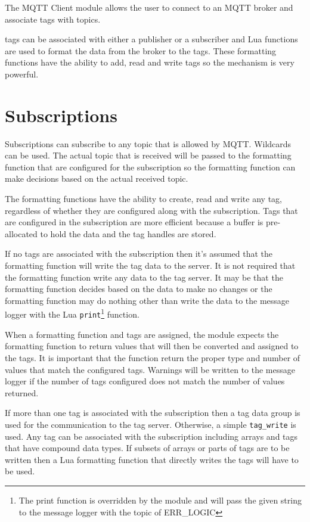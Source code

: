 The MQTT Client module allows the user to connect to an MQTT broker and associate tags with topics.

\opendax tags can be associated with either a publisher or a subscriber and Lua functions are used to format the data from the broker to the \opendax tags.  These formatting functions have the ability to add, read and write tags so the mechanism is very powerful.

\section{Subscriptions}

Subscriptions can subscribe to any topic that is allowed by MQTT.  Wildcards can be used.  The actual topic that is received will be passed to the formatting function that are configured for the subscription so the formatting function can make decisions based on the actual received topic.

The formatting functions have the ability to create, read and write any tag, regardless of whether they are configured along with the subscription.  Tags that are configured in the subscription are more efficient because a buffer is pre-allocated to hold the data and the tag handles are stored.

If no tags are associated with the subscription then it's assumed that the formatting function will write the tag data to the server.  It is not required that the formatting function write any data to the tag server.  It may be that the formatting function decides based on the data to make no changes or the formatting function may do nothing other than write the data to the message logger with the Lua \texttt{print}\footnote{The print function is overridden by the module and will pass the given string to the message logger with the topic of ERR\_LOGIC} function.

When a formatting function and tags are assigned, the module expects the formatting function to return values that will then be converted and assigned to the tags.  It is important that the function return the proper type and number of values that match the configured tags.  Warnings will be written to the message logger if the number of tags configured does not match the number of values returned.

If more than one tag is associated with the subscription then a tag data group is used for the communication to the tag server.  Otherwise, a simple \texttt{tag\_write} is used.  Any tag can be associated with the subscription including arrays and tags that have compound data types.  If subsets of arrays or parts of tags are to be written then a Lua formatting function that directly writes the tags will have to be used.

